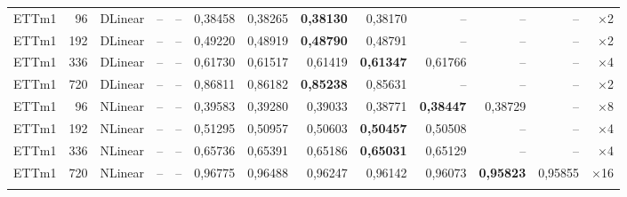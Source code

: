 {\begin{longtable}{@{}lrl rrrrrrrrr r@{}}
\addlinespace[2pt]
ETTm1 & 96 & DLinear & -- & -- & 0{,}38458 & 0{,}38265 & \textbf{0{,}38130} & 0{,}38170 & -- & -- & -- & $\times$2 \\
ETTm1 & 192 & DLinear & -- & -- & 0{,}49220 & 0{,}48919 & \textbf{0{,}48790} & 0{,}48791 & -- & -- & -- & $\times$2 \\
ETTm1 & 336 & DLinear & -- & -- & 0{,}61730 & 0{,}61517 & 0{,}61419 & \textbf{0{,}61347} & 0{,}61766 & -- & -- & $\times$4 \\
ETTm1 & 720 & DLinear & -- & -- & 0{,}86811 & 0{,}86182 & \textbf{0{,}85238} & 0{,}85631 & -- & -- & -- & $\times$2 \\
\addlinespace[2pt]
ETTm1 & 96 & NLinear & -- & -- & 0{,}39583 & 0{,}39280 & 0{,}39033 & 0{,}38771 & \textbf{0{,}38447} & 0{,}38729 & -- & $\times$8 \\
ETTm1 & 192 & NLinear & -- & -- & 0{,}51295 & 0{,}50957 & 0{,}50603 & \textbf{0{,}50457} & 0{,}50508 & -- & -- & $\times$4 \\
ETTm1 & 336 & NLinear & -- & -- & 0{,}65736 & 0{,}65391 & 0{,}65186 & \textbf{0{,}65031} & 0{,}65129 & -- & -- & $\times$4 \\
ETTm1 & 720 & NLinear & -- & -- & 0{,}96775 & 0{,}96488 & 0{,}96247 & 0{,}96142 & 0{,}96073 & \textbf{0{,}95823} & 0{,}95855 & $\times$16 \\
\addlinespace[2pt]
\bottomrule
\end{longtable}
}
